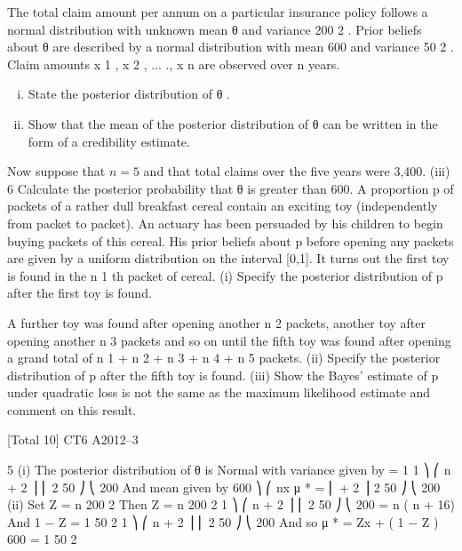 \documentclass[a4paper,12pt]{article}
\begin{document}
\begin{enumerate}
The total claim amount per annum on a particular insurance policy follows a normal distribution with unknown mean θ and variance 200 2 . Prior beliefs about θ are described by a normal distribution with mean 600 and variance 50 2 . Claim amounts
x 1 , x 2 , ... ., x n are observed over n years.

\begin{enumerate}[(i)]
\item State the posterior distribution of θ .
\item Show that the mean of the posterior distribution of θ can be written in the
form of a credibility estimate.
\end{enumerate}

Now suppose that $n=5$ and that total claims over the five years were 3,400.
(iii)
6
Calculate the posterior probability that θ is greater than 600.
A proportion p of packets of a rather dull breakfast cereal contain an exciting toy (independently from packet to packet). An actuary has been persuaded by his children to begin buying packets of this cereal. His prior beliefs about p before
opening any packets are given by a uniform distribution on the interval [0,1]. It turns out the first toy is found in the n 1 th packet of cereal.
(i)
Specify the posterior distribution of p after the first toy is found.

A further toy was found after opening another n 2 packets, another toy after opening
another n 3 packets and so on until the fifth toy was found after opening a grand total
of n 1 + n 2 + n 3 + n 4 + n 5 packets.
(ii) Specify the posterior distribution of p after the fifth toy is found.
(iii) Show the Bayes’ estimate of p under quadratic loss is not the same as the
maximum likelihood estimate and comment on this result.

[Total 10]
CT6 A2012–3




5
(i)
The posterior distribution of θ is Normal with variance given by
 =
1
1 ⎞
⎛ n
+ 2 ⎟
⎜
2
50 ⎠
⎝ 200
And mean given by
600 ⎞
⎛ nx
μ * =  ⎜
+ 2 ⎟
2
50 ⎠
⎝ 200
(ii)
Set
Z = 
n
200 2
Then
Z =
n
200 2
1 ⎞
⎛ n
+ 2 ⎟
⎜
2
50 ⎠
⎝ 200
=
n
( n + 16)
And
1 − Z =
1
50 2
1 ⎞
⎛ n
+ 2 ⎟
⎜
2
50 ⎠
⎝ 200
And so
μ * = Zx + ( 1 − Z ) 600
= 
1
50 2


\end{enumerate}
\end{document}
